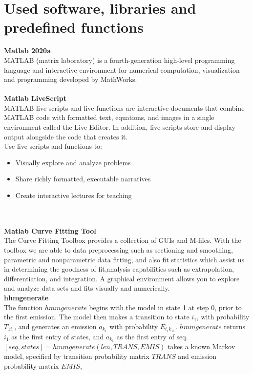 \section{Used software, libraries and predefined functions} \label{subsec:libraries}
\textbf{Matlab 2020a}\\
MATLAB (matrix laboratory) is a fourth-generation high-level programming language and interactive environment for numerical
computation, visualization and programming developed by MathWorks.\\
\\
\textbf{Matlab LiveScript}~\cite{livescript}\\
MATLAB live scripts and live functions are interactive documents that combine MATLAB code with formatted text, equations,
and images in a single environment called the Live Editor.
In addition, live scripts store and display output alongside the code that creates it.\\
Use live scripts and functions to:\\
\begin{itemize}
    \item Visually explore and analyze problems
    \item Share richly formatted, executable narratives
    \item Create interactive lectures for teaching
\end{itemize}\\
\\
\textbf{Matlab Curve Fitting Tool}\\
The Curve Fitting Toolbox provides a collection of GUIs and M-files.
With the toolbox we are able to data preprocessing such as sectioning and smoothing, parametric and nonparametric data fitting,
and also fit statistics which assist us in determining the goodness of fit,analysis capabilities such as extrapolation, differentiation, and integration.
A graphical environment allows you to explore and analyze data sets and fits visually and numerically.\\
\textbf{hhmgenerate}~\cite{hhmgenerate}\\
The function $hmmgenerate$ begins with the model in state 1 at step 0, prior to the first emission.
The model then makes a transition to state $i_1$, with probability $T_{1i_1}$, and generates an emission $a_k_1$ with probability $E_{i_1k_11}$.
$hmmgenerate$ returns $i_1$ as the first entry of states, and $a_k_1$ as the first entry of seq.
$[seq,states] = hmmgenerate(len,TRANS,EMIS)$ takes a known Markov model, specified by transition probability matrix $TRANS$ and emission probability matrix $EMIS$,

